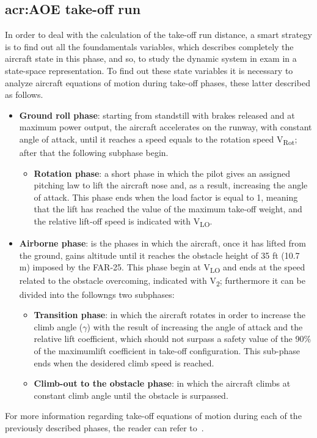 \subsection{\gls{acr:AOE} take-off run}
In order to deal with the calculation of the take-off run distance, a smart strategy is to find out all the foundamentals variables, which describes completely the aircraft state in this phase, and so, to study the dynamic system in exam in a state-space representation.
%
\noindent
To find out these state variables it is necessary to analyze aircraft equations of motion during take-off phases, these latter described as follows.
\begin{itemize}
\item \textbf{Ground roll phase}: starting from standstill with brakes released and at maximum power output, the aircraft accelerates on the runway, with constant angle of attack, until it reaches a speed equals to the rotation speed V\textsubscript{Rot}; after that the following subphase begin.
%
\begin{itemize}
\item \textbf{Rotation phase}: a short phase in which the pilot gives an assigned pitching law to lift the aircraft nose and, as a result, increasing the angle of attack. This phase ends when the load factor is equal to 1, meaning that the lift has reached the value of the maximum take-off weight, and the relative lift-off speed is indicated with V\textsubscript{LO}. 
%
\end{itemize}
%
\item \textbf{Airborne phase}: is the phases in which the aircraft, once it has lifted from the ground, gains altitude until it reaches the obstacle height of 35 \si{ft} (10.7 \si{\meter}) imposed by the FAR-25. This phase begin at V\textsubscript{LO} and ends at the speed related to the obstacle overcoming, indicated with V\textsubscript{2}; furthermore it can be divided into the followngs two subphases:
%
\begin{itemize}
\item \textbf{Transition phase}: in which the aircraft rotates in order to increase the climb angle ($\gamma$) with the result of increasing the angle of attack and the relative lift coefficient, which should not surpass a safety value of the 90\% of the maximumlift coefficient in take-off configuration. This sub-phase ends when the desidered climb speed is reached.
%
\item \textbf{Climb-out to the obstacle phase}: in which the aircraft climbs at constant climb angle until the obstacle is surpassed.
\end{itemize}
\end{itemize}
%
\noindent
For more information regarding take-off equations of motion during each of the previously described phases, the reader can refer to~\cite{McCormick}.

